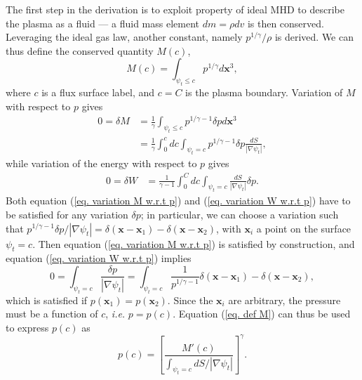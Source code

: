 \documentclass[my_thesis.tex]{subfiles}
\begin{document}
The first step in the derivation is to exploit property of ideal MHD to describe the plasma as a fluid --- a fluid mass element $dm=\rho dv$ is then conserved. Leveraging the ideal gas law, another constant, namely $p^{1/\gamma} / \rho$ is derived. We can thus define the conserved quantity $M(c)$,
\begin{equation}
	M(c) = \int_{\psi_t\leq c} p^{1/\gamma}d\mathbf{x}^3, \label{eq. def M}
\end{equation}
where $c$ is a flux surface label, and $c=C$ is the plasma boundary. Variation of $M$ with respect to $p$ gives
\begin{align}
	0=\delta M &= \frac{1}{\gamma}\int_{\psi_t\leq c} p^{1/\gamma-1}\delta pd\mathbf{x}^3\\
	&=\frac{1}{\gamma}\int_0^c dc \int_{\psi_t=c} p^{1/\gamma-1}\delta p\frac{dS}{|\nabla\psi_t|}, \label{eq. variation M w.r.t p}
\end{align}
while variation of the energy with respect to $p$ gives
\begin{align}
	0=\delta W &= \frac{1}{\gamma-1} \int_0^C dc \int_{\psi_t=c} \frac{dS}{|\nabla\psi_t|}\delta p. \label{eq. variation W w.r.t p}
\end{align}
Both equation (\ref{eq. variation M w.r.t p}) and (\ref{eq. variation W w.r.t p}) have to be satisfied for any variation $\delta p$; in particular, we can choose a variation such that $p^{1/\gamma-1}\delta p/|\nabla \psi_t| = \delta(\mathbf{x}-\mathbf{x}_1)-\delta(\mathbf{x}-\mathbf{x}_2)$, with $\mathbf{x}_i$ a point on the surface $\psi_t=c$. Then equation (\ref{eq. variation M w.r.t p}) is satisfied by construction, and equation (\ref{eq. variation W w.r.t p}) implies
\begin{equation}
	0 = \int_{\psi_t=c}\frac{\delta p}{|\nabla \psi_t|} = \int_{\psi_t=c}\frac{1}{p^{1/\gamma-1}}\delta(\mathbf{x}-\mathbf{x}_1)-\delta(\mathbf{x}-\mathbf{x}_2),
\end{equation}
which is satisfied if $p(\mathbf{x}_1)=p(\mathbf{x}_2)$. Since the $\mathbf{x}_i$ are arbitrary, the pressure must be a function of $c$, \textit{i.e.} $p = p(c)$. Equation (\ref{eq. def M}) can thus be used to express $p(c)$ as
\begin{equation}
	p(c) = \left[\frac{M'(c)}{\int_{\psi_t=c}dS/|\nabla\psi_t|}\right]^\gamma.
\end{equation}
\end{document}
